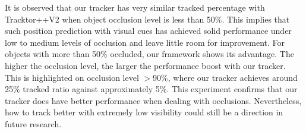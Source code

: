 \documentclass[final]{cvpr}
\begin{document}
It is observed that our tracker has very similar tracked percentage with Tracktor++V2 \cite{Bergmann2019a} when object occlusion level is less than 50\%. This implies that such position prediction with visual cues has achieved solid performance under low to medium levels of occlusion and leave little room for improvement. For objects with more than 50\% occluded, our framework shows its advantage. The higher the occlusion level, the larger the performance boost with our tracker. This is highlighted on occlusion level $>$90\%, where our tracker achieves around 25\% tracked ratio against approximately 5\%. This experiment confirms that our tracker does have better performance when dealing with occlusions. Nevertheless, how to track better with extremely low visibility could still be a direction in future research.




\end{document}
